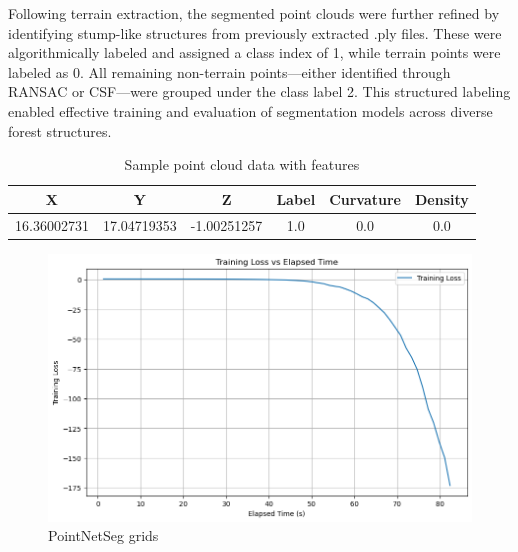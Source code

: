 \documentclass[../report.tex]{subfiles}
\begin{document}
Following terrain extraction, the segmented point clouds were further refined by identifying stump-like structures from previously extracted .ply files. These were algorithmically labeled and assigned a class index of 1, while terrain points were labeled as 0. All remaining non-terrain points—either identified through RANSAC or CSF—were grouped under the class label 2. This structured labeling enabled effective training and evaluation of segmentation models across diverse forest structures.\cite{Pytorch_Pointnet_Pointnet2}

\begin{table}[h!]
\centering

\begin{tabular}{cccccc}
\toprule
X & Y & Z & Label & Curvature & Density \\
\midrule
16.36002731 & 17.04719353 & -1.00251257 & 1.0 & 0.0 & 0.0 \\
\bottomrule
\end{tabular}
\caption{Sample point cloud data with features}
\label{tab:datasample}
\end{table}

\begin{figure}
    \centering
    \includegraphics[width=0.7\linewidth]{rnd-project-report-main/figures/PointNetSeg_grids.png}
    \caption{PointNetSeg grids}
    \label{fig:pointnetseg_grids}
\end{figure}
\end{document}
